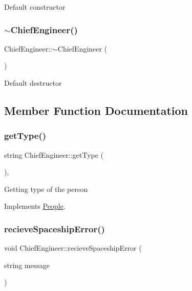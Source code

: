 Default constructor \mbox{\label{classChiefEngineer_aa647c8d8f2d872dc3838211725fd05db}} 
\subsubsection{\texorpdfstring{$\sim$\+Chief\+Engineer()}{~ChiefEngineer()}}
{\footnotesize\ttfamily Chief\+Engineer\+::$\sim$\+Chief\+Engineer (\begin{DoxyParamCaption}{ }\end{DoxyParamCaption})\hspace{0.3cm}{\ttfamily [inline]}}

Default destructor 

\subsection{Member Function Documentation}
\mbox{\label{classChiefEngineer_abd3df4d2f94acff4c659f9e428ad1789}} 
\subsubsection{\texorpdfstring{get\+Type()}{getType()}}
{\footnotesize\ttfamily string Chief\+Engineer\+::get\+Type (\begin{DoxyParamCaption}{ }\end{DoxyParamCaption})\hspace{0.3cm}{\ttfamily [inline]}, {\ttfamily [virtual]}}

Getting type of the person 

Implements \hyperlink{classPeople_af60dd882d60cddf63f9b95815ce551a8}{People}.

\mbox{\label{classChiefEngineer_a7170ae93d7eadc1a68bc86c25a9be0db}} 
\subsubsection{\texorpdfstring{recieve\+Spaceship\+Error()}{recieveSpaceshipError()}}
{\footnotesize\ttfamily void Chief\+Engineer\+::recieve\+Spaceship\+Error (\begin{DoxyParamCaption}\item[{string}]{message }\end{DoxyParamCaption})\hspace{0.3cm}{\ttfamily [virtual]}}

